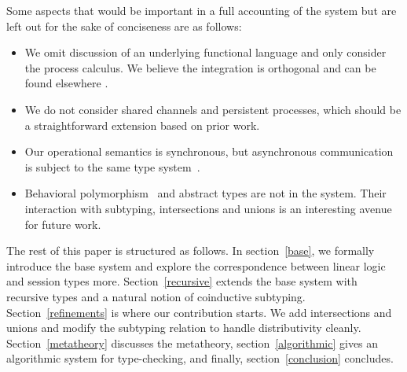 \documentclass[a4paper,USenglish]{lipics-v2016}
\begin{document}
Some aspects that would be important in a full accounting of the system but are left out for the sake of conciseness are as follows:
\begin{itemize}
  \item We omit discussion of an underlying functional language and only consider the process calculus. We believe the integration is orthogonal and can be found elsewhere \cite{ToninhoCP13,Toninho15phd,Griffith16phd}.
  \item We do not consider shared channels and persistent processes, which should be a straightforward extension based on prior work. \cite{CairesP10,PfenningG15}
  \item Our operational semantics is synchronous, but asynchronous communication~\cite{DeYoung12csl} is subject to the same type system~\cite{PfenningG15,Griffith16phd}.
  \item Behavioral polymorphism~\cite{Caires13esop} and abstract types are not in the system. Their interaction with subtyping, intersections and unions is an interesting avenue for future work.
\end{itemize}

The rest of this paper is structured as follows. In section~\ref{base}, we formally introduce the base system and explore the correspondence between linear logic and session types more. Section~\ref{recursive} extends the base system with recursive types and a natural notion of coinductive subtyping. Section~\ref{refinements} is where our contribution starts. We add intersections and unions and modify the subtyping relation to handle distributivity cleanly. Section~\ref{metatheory} discusses the metatheory, section~\ref{algorithmic} gives an algorithmic system for type-checking, and finally, section~\ref{conclusion} concludes.
\end{document}
